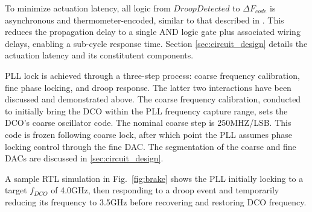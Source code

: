 \documentclass[twoside,9pt,journal,letterpage]{IEEEtran}
\begin{document}
To minimize actuation latency, all logic from $DroopDetected$ to $\Delta F_{code}$ is asynchronous and thermometer-encoded, similar to that described in \cite{hashimoto2018}. This reduces the propagation delay to a single AND logic gate plus associated wiring delays, enabling a sub-cycle response time. Section \ref{sec:circuit_design} details the actuation latency and its constitutent components. 

PLL lock is achieved through a three-step process: coarse frequency calibration, fine phase locking, and droop response. The latter two interactions have been discussed and demonstrated above. The coarse frequency calibration, conducted to initially bring the DCO within the PLL frequency capture range, sets the DCO's coarse oscillator code. The nominal coarse step is 250MHZ/LSB. This code is frozen following coarse lock, after which point the PLL assumes phase locking control through the fine DAC. The segmentation of the coarse and fine DACs are discussed in \ref{sec:circuit_design}. 


A sample RTL simulation in Fig.\ \ref{fig:brake} shows the PLL initially locking to a target $f_{DCO}$ of 4.0GHz, then responding to a droop event and temporarily reducing its frequency to 3.5GHz before recovering and restoring DCO frequency.
\end{document}
